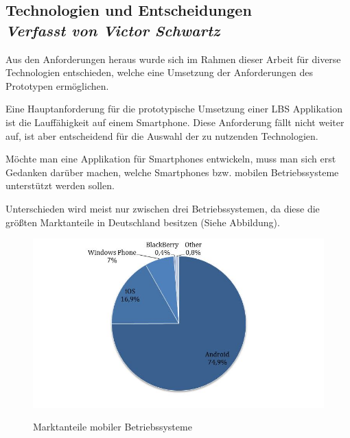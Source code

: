 \subsection[Technologien und Entscheidungen]{Technologien und Entscheidungen
 \\ \textnormal{\small{\textit {Verfasst von Victor Schwartz}}}}

Aus den Anforderungen heraus wurde sich im Rahmen dieser Arbeit für diverse Technologien entschieden, welche eine Umsetzung der Anforderungen des Prototypen ermöglichen.


Eine Hauptanforderung für die prototypische Umsetzung einer LBS Applikation ist 
die Lauffähigkeit auf einem Smartphone. Diese Anforderung fällt nicht weiter auf, 
ist aber entscheidend für die Auswahl der zu nutzenden Technologien.

Möchte man eine Applikation für Smartphones entwickeln, muss man sich erst Gedanken 
darüber machen, welche Smartphones bzw. mobilen Betriebssysteme unterstützt 
werden sollen.

Unterschieden wird meist nur zwischen drei Betriebssystemen, da diese die größten 
Marktanteile in Deutschland besitzen (Siehe Abbildung). 

\begin{figure}[h]
  \centering
    \includegraphics[width=1\textwidth]{ref/images/marktanteil.jpg} 
   \caption{Marktanteile mobiler Betriebssysteme}
  \label{fig:Marktanteile mobiler Betriebssysteme}
  \cite{Marktanteil}
\end{figure}

